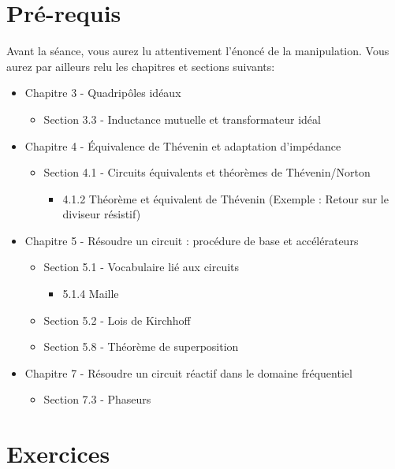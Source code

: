 \section{Pré-requis}
Avant la séance, vous aurez lu attentivement l'énoncé de la manipulation. Vous aurez par ailleurs relu les chapitres et sections suivants:
\begin{itemize}
	\item Chapitre 3 - Quadripôles idéaux
		\begin{itemize}
		\item Section 3.3 - Inductance mutuelle et transformateur idéal
		\end{itemize}
	\item Chapitre 4 - Équivalence de Thévenin et adaptation d’impédance
		\begin{itemize}
		\item Section 4.1 - Circuits équivalents et théorèmes de Thévenin/Norton
			\begin{itemize}
			\item 4.1.2 Théorème et équivalent de Thévenin (Exemple : Retour sur le diviseur résistif)
			\end{itemize}
		\end{itemize}
	\item Chapitre 5 - Résoudre un circuit : procédure de base et accélérateurs
		\begin{itemize}
		\item Section 5.1 - Vocabulaire lié aux circuits
			\begin{itemize}
			\item 5.1.4 Maille
			\end{itemize}
		\item Section 5.2 - Lois de Kirchhoff
		\item Section 5.8 - Théorème de superposition
		\end{itemize}
	\item Chapitre 7 - Résoudre un circuit réactif dans le domaine fréquentiel
		\begin{itemize}
		\item Section 7.3 - Phaseurs
		\end{itemize}
\end{itemize}

\vspace{5pt}

\newpage

\section{Exercices}
